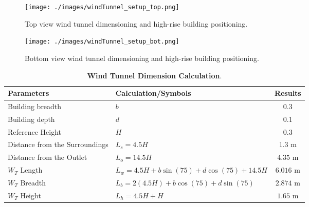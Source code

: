 \documentclass[12pt,a4paper]{cibb}
\begin{document}
\begin{figure}[h]
\vspace{3mm}
 \begin{center}
\texttt{[image: ./images/windTunnel\_setup\_top.png]}
\caption{
Top view wind tunnel dimensioning and high-rise building positioning.}
\label{fig:windtunneltop}
\vspace{-5mm}
\end{center}
\end{figure}

\begin{figure}[h]
\vspace{3mm}
 \begin{center}
\texttt{[image: ./images/windTunnel\_setup\_bot.png]}
\caption{
Bottom view wind tunnel dimensioning and high-rise building positioning.}
\label{fig:windtunnelbot}
\vspace{3mm}
\end{center}
\end{figure}

\begin{table}[httb!] \small
\centering
\vspace{3mm}
    \begin{tabularx}{1\textwidth}{ l  l  c }
        \toprule
          \textbf{Parameters} & \textbf{Calculation/Symbols} & \textbf{Results} \\
        \midrule
        Building breadth & $b$ & $0.3$ \\
        Building depth & $d$ & $0.1$ \\
        Reference Height & $H$ & $0.3$ \\
        Distance from the Surroundings & $L_s = 4.5H$ & $1.3$ m \\
        Distance from the Outlet & $L_o = 14.5H$ & $4.35$ m \\
        $W_T$ Length & $L_w = 4.5H + b\sin(75)+d\cos(75) + 14.5H$ & $6.016$ m\\
        $W_T$ Breadth & $L_b = 2(4.5H) + b\cos(75)+d\sin(75)$ & $2.874$ m \\
        $W_T$ Height & $L_h = 4.5H + H$ & $1.65$ m \\
        \bottomrule
    \end{tabularx}
    \caption{\textbf{Wind Tunnel Dimension Calculation}.
    \label{tab:windtunneldim}}
    \vspace{5mm}
\end{table}
\end{document}
